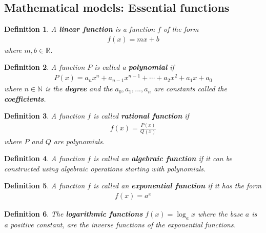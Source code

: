 \documentclass{article}
\theoremstyle{sltheorem}
\newtheorem{definition}{Definition}[section]
\newcommand{\R}{\mathbb{R}}
\newcommand{\N}{\mathbb{N}}
\begin{document}
\subsection{Mathematical models: Essential functions}
\begin{definition}
    A \textbf{linear function} is a function $f$ of the form
    \begin{align*}
        f(x) = mx + b
    \end{align*}
    where $m, b\in\R$.
\end{definition}
\begin{definition}
    A function $P$ is called a \textbf{polynomial} if
    \begin{align*}
        P(x) = a_nx^n+a_{n-1}x^{n-1}+\cdots +a_2x^2 + a_1x+a_0
    \end{align*}
    where $n\in\N$ is the \textbf{degree} and the $a_0, a_1, ..., a_n$ are constants called the \textbf{coefficients}.
\end{definition}
\begin{definition}
    A function $f$ is called \textbf{rational function} if
    \begin{align*}
        f(x) = \frac{P(x)}{Q(x)}
    \end{align*}
    where $P$ and $Q$ are polynomials.
\end{definition}
\begin{definition}
    A function $f$ is called an \textbf{algebraic function} if it can be constructed using algebraic operations starting with polynomials.
\end{definition}
\begin{definition}
    A function $f$ is called an \textbf{exponential function} if it has the form
    \begin{align*}
        f(x) = a^x
    \end{align*}
\end{definition}
\begin{definition}
    The \textbf{logarithmic functions} $f(x) = \log_ax$ where the base $a$ is a positive constant, are the inverse functions of the exponential functions.
\end{definition}
\end{document}
